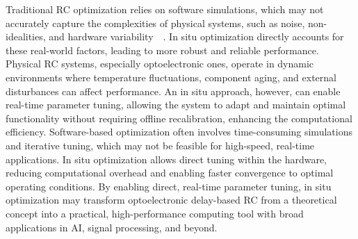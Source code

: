 \documentclass{WileyMSP-template}
\begin{document}


Traditional RC optimization relies on software simulations, which may not accurately capture the complexities of physical systems, such as noise, non-idealities, and hardware variability~\cite{ref:appeltant2011}~\cite{ref:paquot2012,ref:larger2012,ref:duport2012,ref:martinenghi2012,ref:brunner2013,ref:antonik2017,ref:harkhoe2020}. In situ optimization directly accounts for these real-world factors, leading to more robust and reliable performance. Physical RC systems, especially optoelectronic ones, operate in dynamic environments where temperature fluctuations, component aging, and external disturbances can affect performance. An in situ approach, however, can enable real-time parameter tuning, allowing the system to adapt and maintain optimal functionality without requiring offline recalibration, enhancing the computational efficiency. Software-based optimization often involves time-consuming simulations and iterative tuning, which may not be feasible for high-speed, real-time applications. In situ optimization allows direct tuning within the hardware, reducing computational overhead and enabling faster convergence to optimal operating conditions. By enabling direct, real-time parameter tuning, in situ optimization may transform optoelectronic delay-based RC from a theoretical concept into a practical, high-performance computing tool with broad applications in AI, signal processing, and beyond.
\end{document}
